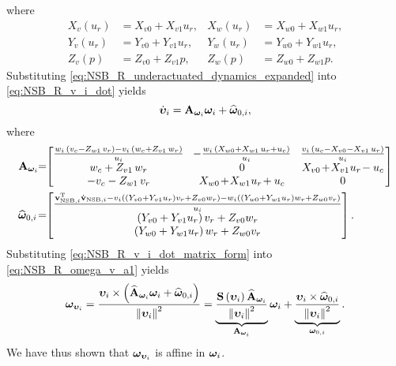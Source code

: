 where
\begin{subequations}
    \begin{align}
        X_v(u_r) &= X_{v0} + X_{v1}u_r, &
        X_w(u_r) &= X_{w0} + X_{w1}u_r, \\
        Y_v(u_r) &= Y_{v0} + Y_{v1}u_r, &
        Y_w(u_r) &= Y_{w0} + Y_{w1}u_r, \\
        Z_v(p) &= Z_{v0} + Z_{v1}p, &
        Z_w(p) &= Z_{w0} + Z_{w1}p.
    \end{align}
\end{subequations}
Substituting \eqref{eq:NSB_R_underactuated_dynamics_expanded} into \eqref{eq:NSB_R_v_i_dot} yields
\begin{equation}
    \dot{\bm{\upsilon}}_i = \mathbf{A}_{\bm{\omega}_i} \bm{\omega}_i + \widehat{\bm{\omega}}_{0, i},
    \label{eq:NSB_R_v_i_dot_matrix_form}
\end{equation}
where
\begin{equation}
    \begin{split}
        \mat{A}_{\bs{\omega}_i\!}\! &=\!\!
        \begin{bmatrix}
            \frac{w_{i}\,\left(v_{c}-Z_{w1}\,v_{r}\right)-v_{i}\,\left(w_{c}+Z_{v1}\,w_{r}\right)}{u_{i}} & 
            \!-\frac{w_{i}\,\left(X_{w0}+X_{w1}\,u_{r}+u_{c}\right)}{u_{i}}\! & 
            \frac{v_{i}\,\left(u_{c}-X_{v0}-X_{v1}\,u_{r}\right)}{u_{i}} \\ 
            w_{c}+Z_{v1}\,w_{r} & 0 & X_{v0\!}+\!X_{v1\!}\,u_{r\!}-u_{c} \\ 
            -v_{c}-Z_{w1}\,v_{r} & \!X_{w0\!}+\!X_{w1\!}\,u_{r\!}+u_{c\!} & 0
        \end{bmatrix} \\
        \widehat{\bs{\omega}}_{0, i}\! &=\!\!
        \begin{bmatrix}
            \frac{\ivel_{{\rm NSB}, i}\T\dot{\ivel}_{{\rm NSB}, i} 
            - v_i\left(\left(Y_{v0} + Y_{v1}u_r\right)v_r + Z_{v0}w_r\right)
            - w_i\left(\left(Y_{w0} + Y_{w1}u_r\right)w_r + Z_{w0}v_r\right)}{u_i} \\
            \left(Y_{v0} + Y_{v1}u_r\right)v_r + Z_{v0}w_r \\
            \left(Y_{w0} + Y_{w1}u_r\right)w_r + Z_{w0}v_r
    \end{bmatrix}.
    \end{split}
\end{equation}
Substituting \eqref{eq:NSB_R_v_i_dot_matrix_form} into \eqref{eq:NSB_R_omega_v_a1} yields
\begin{equation}
    \bm{\omega}_{\bm{\upsilon}_i} = \frac{\bm{\upsilon}_i \times \left(\widehat{\mathbf{A}}_{\bm{\omega}_i}\bm{\omega}_i + \widehat{\bm{\omega}}_{0, i}\right)}{\left\|\bm{\upsilon}_i\right\|^2}
    = \underbrace{\frac{\mathbf{S}\left(\bm{\upsilon}_i\right)\widehat{\mathbf{A}}_{\bm{\omega}_i}}{\left\|\bm{\upsilon}_i\right\|^2}}_{\mathbf{A}_{\bm{\omega}_i}}\bm{\omega}_i
     + \underbrace{\frac{\bm{\upsilon}_i \times \widehat{\bm{\omega}}_{0, i}}{\left\|\bm{\upsilon}_i\right\|^2}}_{\bm{\omega}_{0, i}}.
     \label{eq:NSB_R_omega_v_affine}
\end{equation}
We have thus shown that $\bm{\omega}_{\bm{\upsilon}_i}$ is affine in $\bm{\omega}_i$.

